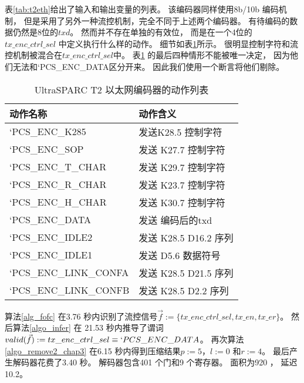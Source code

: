 表\ref{tab:t2eth}给出了输入和输出变量的列表。
该编码器同样使用8b/10b 编码机制，
但是采用了另外一种流控机制，完全不同于上述两个编码器。
有待编码的数据仍然是8位的$txd$。
然而并不存在单独的有效位，
而是在一个4位的$tx\_enc\_ctrl\_sel$ 中定义执行什么样的动作。
细节如表\ref{tab:one}所示。
很明显控制字符和流控机制被混合在$tx\_enc\_ctrl\_sel$中。
表\ref{tab:one} 的最后四种情形不能被唯一决定，
因为他们无法和`PCS\_ENC\_DATA区分开来。
因此我们使用一个断言将他们剔除。

\begin{table}[t]%
\caption{UltraSPARC T2 以太网编码器的动作列表}
\label{tab:one}
\centering
\begin{tabular}{|l|l|}
\hline
动作名称          & 动作含义\\\hline\hline
`PCS\_ENC\_K285   & 发送K28.5 控制字符\\\hline
`PCS\_ENC\_SOP  & 发送 K27.7 控制字符\\\hline
`PCS\_ENC\_T\_CHAR    & 发送 K29.7 控制字符\\\hline
`PCS\_ENC\_R\_CHAR   & 发送 K23.7 控制字符\\\hline
`PCS\_ENC\_H\_CHAR     & 发送 K30.7 控制字符\\\hline
`PCS\_ENC\_DATA     & 发送 编码后的txd\\\hline
`PCS\_ENC\_IDLE2     & 发送 K28.5 D16.2 序列\\\hline
`PCS\_ENC\_IDLE1       & 发送 D5.6 数据符号\\\hline
`PCS\_ENC\_LINK\_CONFA & 发送  K28.5 D21.5 序列\\\hline
`PCS\_ENC\_LINK\_CONFB     & 发送 K28.5 D2.2 序列\\\hline
\end{tabular}
\end{table}%

算法\ref{alg_fofc} 在3.76 秒内识别了流控信号$\vec{f}:=\{tx\_enc\_ctrl\_sel,tx\_en, tx\_er\}$。
然后算法\ref{algo_infer} 在 21.53 秒内推导了谓词$valid(\vec{f}):=tx\_enc\_ctrl\_sel\equiv `PCS\_ENC\_DATA$。
再次算法\ref{algo_remove2_chap3} 在6.15 秒内得到压缩结果$p:=5$，$l:=0$ 和$r:=4$。
最后产生解码器花费了3.40 秒。
解码器包含401 个门和9 个寄存器。
面积为920 ，
延迟10.2。

